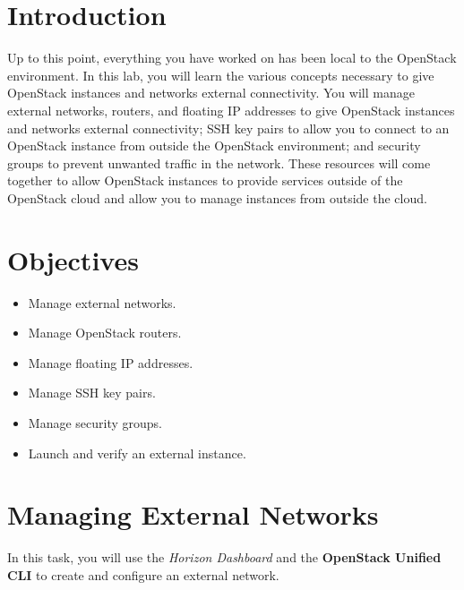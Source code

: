 \documentclass[letterpaper, 12pt]{article}
\begin{document}

\section*{Introduction}
\label{sec:introduction}
Up to this point, everything you have worked on has been local to the OpenStack environment. In this lab, you will learn
the various concepts necessary to give OpenStack instances and networks external connectivity. You will manage external
networks, routers, and floating IP addresses to give OpenStack instances and networks external connectivity; SSH key
pairs to allow you to connect to an OpenStack instance from outside the OpenStack environment; and security groups to
prevent unwanted traffic in the network. These resources will come together to allow OpenStack instances to provide
services outside of the OpenStack cloud and allow you to manage instances from outside the cloud.

\section*{Objectives}
\label{sec:objectives}
\begin{itemize}[itemsep=0pt]
    \item Manage external networks.
    \item Manage OpenStack routers.
    \item Manage floating IP addresses.
    \item Manage SSH key pairs.
    \item Manage security groups.
    \item Launch and verify an external instance.
\end{itemize}
\clearpage

\labsettings

\section{Managing External Networks}
\label{sec:managing_external_networks}
In this task, you will use the \textit{Horizon Dashboard} and the \textbf{OpenStack Unified CLI} to create and configure
an external network.
\end{document}
